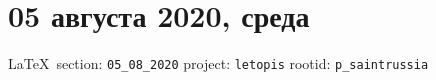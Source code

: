  
 
\section{05 августа 2020, среда}
\label{sec:05_08_2020}
  
{\ifDEBUG\fi\small\LaTeX~section: \verb|05_08_2020| project: \verb|letopis| rootid: \verb|p_saintrussia|}


  
